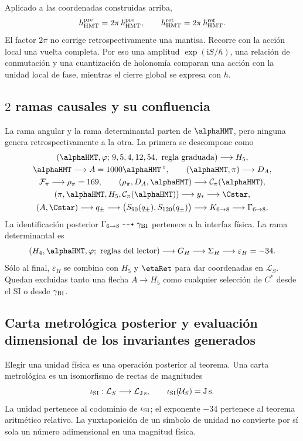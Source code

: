 Aplicado a las coordenadas construidas arriba,
\[
 h_{\rm HMT}^{\rm pre}
 =2\pi\,\hbar_{\rm HMT}^{\rm pre},\qquad
 h_{\rm HMT}^{\rm ret}
 =2\pi\,\hbar_{\rm HMT}^{\rm ret}.
\]
El factor \(2\pi\) no corrige retrospectivamente una mantisa. Recorre con la
acción local una vuelta completa. Por eso una amplitud
\(\exp(\mathrm iS/\hbar)\), una relación de conmutación y una cuantización
de holonomía comparan una acción con la unidad local de fase, mientras el
cierre global se expresa con \(h\).

\subsection{\(2\) ramas causales y su confluencia}

La rama angular y la rama determinantal parten de
\(\alphaHMT\), pero ninguna genera retrospectivamente a la otra. La primera
se descompone como
\[
\begin{gathered}
(\alphaHMT,\varphi;\,9,5,4,12,54,\text{ regla graduada})
\longrightarrow H_5,\\
\alphaHMT\longrightarrow A=1000\alphaHMT\,{}^\circ,
\qquad
(\alphaHMT,\pi)\longrightarrow D_A,\\
\mathcal F_\pi\longrightarrow\rho_\pi=169,\qquad
(\rho_\pi,D_A,\alphaHMT)\longrightarrow\mathcal C_\pi(\alphaHMT),\\
(\pi,\alphaHMT,H_5,\mathcal C_\pi(\alphaHMT))
\longrightarrow y_*\longrightarrow\Cstar,\\
(A,\Cstar)\longrightarrow q_\pm
\longrightarrow\bigl(S_{90}(q_\pm),S_{120}(q_\pm)\bigr)
\longrightarrow K_{6\to8}
\longrightarrow\Gamma_{6\to8}.
\end{gathered}
\]
La identificación posterior
\(\Gamma_{6\to8}\dashrightarrow\gamma_{\rm BI}\) pertenece a la interfaz
física. La rama determinantal es
\[
(H_4,\alphaHMT,\varphi;\text{ reglas del lector})
\longrightarrow G_H
\longrightarrow\Sigma_H
\longrightarrow\varepsilon_H=-34.
\]
Sólo al final, \(\varepsilon_H\) se combina con \(H_5\) y \(\etaRet\) para
dar coordenadas en \(\mathcal L_S\). Quedan excluidas tanto una flecha
\(A\to H_5\) como cualquier selección de \(C^*\) desde el SI o desde
\(\gamma_{\rm BI}\).

\subsection{Carta metrológica posterior y evaluación dimensional de los invariantes generados}

Elegir una unidad física es una operación posterior al teorema. Una carta
metrológica es un isomorfismo de rectas de magnitudes
\[
\iota_{\rm SI}:\mathcal L_S\longrightarrow\mathcal L_{\mathrm{J\,s}},
\qquad
\iota_{\rm SI}(\mathcal U_S)=\mathrm{J\,s}.
\]
La unidad pertenece al codominio de \(\iota_{\rm SI}\); el exponente
\(-34\) pertenece al teorema aritmético relativo. La yuxtaposición de un
símbolo de unidad no convierte por sí sola un número adimensional en una
magnitud física.

